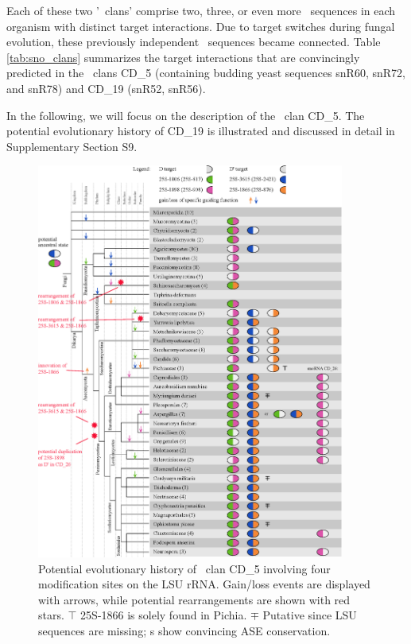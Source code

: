 Each of these two '\sno\ clans' comprise two,
three, or even more \sno\ sequences in each organism with distinct
target interactions. Due to target switches during fungal evolution,
these previously independent \sno\ sequences became connected. Table
\ref{tab:sno_clans} summarizes the target interactions that are
convincingly predicted in the \sno\ clans CD\_5 (containing budding
yeast sequences snR60, snR72, and snR78) and CD\_19 (snR52, snR56).

In the following, we will focus on the description of the \sno\ clan
CD\_5. The potential evolutionary history of CD\_19 is illustrated and
discussed in detail in Supplementary Section S9.

\begin{figure}
  \centering
  \includegraphics[width=0.9\textwidth]{pics/target_switches_CD_5.eps}
  \caption[Potential evolutionary history of \sno\ clan
  CD\_5.]{Potential evolutionary history of \sno\ clan CD\_5 involving
    four modification sites on the LSU rRNA. Gain/loss events are
    displayed with arrows, while potential rearrangements are shown
    with red stars. $\top$ 25S-1866 is solely found in Pichia. $\mp$
    Putative since LSU sequences are missing; \sno s show convincing
    ASE conservation.}
  \label{fig:CD_5}
\end{figure}

